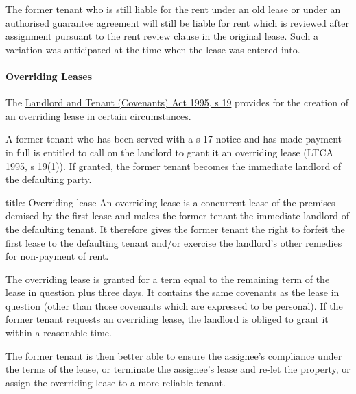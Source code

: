 \documentclass[
]{article}
\newenvironment{Shaded}{}{}
\newcommand{\NormalTok}[1]{#1}
\begin{document}
\begin{Shaded}
\begin{Highlighting}[]
\NormalTok{The former tenant who is still liable for the rent under an old lease or under an authorised guarantee agreement will still be liable for rent which is reviewed after assignment pursuant to the rent review clause in the original lease. Such a variation was anticipated at the time when the lease was entered into.}
\end{Highlighting}
\end{Shaded}

\hypertarget{overriding-leases}{%
\paragraph{Overriding Leases}\label{overriding-leases}}

The
\href{https://www.legislation.gov.uk/ukpga/1995/30/section/19}{Landlord
and Tenant (Covenants) Act 1995, s 19} provides for the creation of an
overriding lease in certain circumstances.

A former tenant who has been served with a s 17 notice and has made
payment in full is entitled to call on the landlord to grant it an
overriding lease (LTCA 1995, s 19(1)). If granted, the former tenant
becomes the immediate landlord of the defaulting party.

\begin{Shaded}
\begin{Highlighting}[]
\NormalTok{title: Overriding lease}
\NormalTok{An overriding lease is a concurrent lease of the premises demised by the first lease and makes the former tenant the immediate landlord of the defaulting tenant. It therefore gives the former tenant the right to forfeit the first lease to the defaulting tenant and/or exercise the landlord’s other remedies for non{-}payment of rent.}
\end{Highlighting}
\end{Shaded}

The overriding lease is granted for a term equal to the remaining term
of the lease in question plus three days. It contains the same covenants
as the lease in question (other than those covenants which are expressed
to be personal). If the former tenant requests an overriding lease, the
landlord is obliged to grant it within a reasonable time.

The former tenant is then better able to ensure the assignee's
compliance under the terms of the lease, or terminate the assignee's
lease and re-let the property, or assign the overriding lease to a more
reliable tenant.
\end{document}
